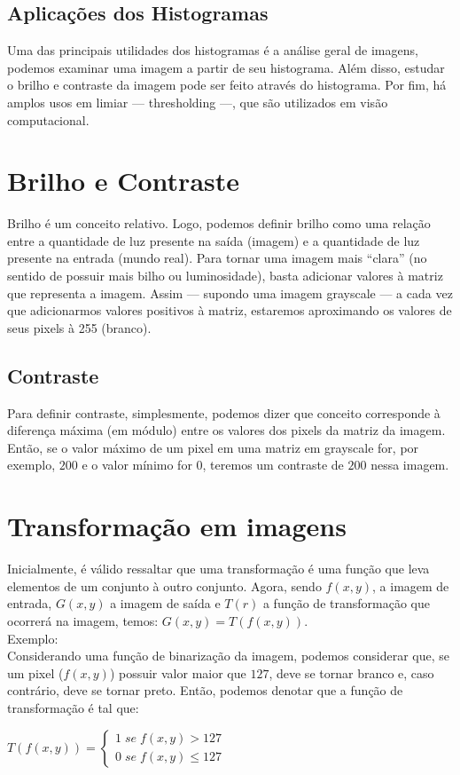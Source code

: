 \documentclass[a4paper, 12pt]{article}
\begin{document}
\subsection{Aplicações dos Histogramas}
Uma das principais utilidades dos histogramas é a análise geral de imagens, podemos examinar uma imagem a partir de seu histograma. Além disso, 
estudar o brilho e contraste da imagem pode ser feito através do histograma. Por fim, há amplos usos em limiar --- thresholding ---, que são utilizados 
em visão computacional.

\section{Brilho e Contraste}
Brilho é um conceito relativo. Logo, podemos definir brilho como uma relação entre a quantidade de luz presente na saída (imagem) e 
a quantidade de luz presente na entrada (mundo real). Para tornar uma imagem mais ``clara'' (no sentido de possuir mais bilho ou luminosidade), basta adicionar 
valores à matriz que representa a imagem. Assim --- supondo uma imagem grayscale --- a cada vez que adicionarmos valores positivos à matriz, estaremos 
aproximando os valores de seus pixels à 255 (branco).

\subsection{Contraste}
Para definir contraste, simplesmente, podemos dizer que conceito corresponde à diferença máxima (em módulo) entre os valores dos pixels da matriz da imagem.
Então, se o valor máximo de um pixel em uma matriz em grayscale for, por exemplo, $200$ e o valor mínimo for $0$, teremos um contraste de $200$ nessa imagem.

\section{Transformação em imagens}
Inicialmente, é válido ressaltar que uma transformação é uma função que leva elementos de um conjunto à outro conjunto. Agora, sendo 
$f(x, y)$, a imagem de entrada, $G(x, y)$ a imagem de saída e $T(r)$ a função de transformação que ocorrerá na imagem, temos:
$G(x, y) = T(f(x, y))$.
\\
Exemplo:
\\

Considerando uma função de binarização da imagem, podemos considerar que, se um pixel ($f(x, y)$) possuir valor maior que $127$, deve se 
tornar branco e, caso contrário, deve se tornar preto. Então, podemos denotar que a função de transformação é tal que:
\begin{center}
	$T(f(x, y)) = 
	\begin{cases}
		1 \; se \; f(x, y) > 127 \\
		0 \; se \; f(x, y) \leq 127
	\end{cases}$
\end{center}
\end{document}
